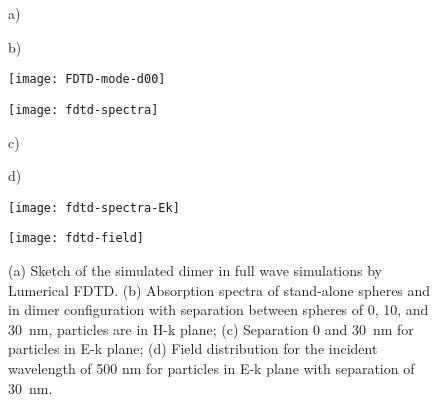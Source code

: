 \documentclass[a4paper]{article}
\begin{document}
\begin{figure}
  \begin{minipage}[h]{0.49\textwidth}    \begin{flushleft}     a)    \end{flushleft}
  \end{minipage}
  \begin{minipage}[h]{0.49\textwidth}    \begin{flushleft}     b)    \end{flushleft}
  \end{minipage}
  \begin{minipage}[h]{0.49\textwidth} 
   \texttt{[image: FDTD-mode-d00]}
  \end{minipage}
  \begin{minipage}[h]{0.49\textwidth} 
   \texttt{[image: fdtd-spectra]}
  \end{minipage}
  \begin{minipage}[h]{0.49\textwidth}    \begin{flushleft}     c)    \end{flushleft}
  \end{minipage}
  \begin{minipage}[h]{0.49\textwidth}    \begin{flushleft}     d)   \end{flushleft}
  \end{minipage}
  \begin{minipage}[h]{0.49\textwidth} 
    \texttt{[image: fdtd-spectra-Ek]}
  \end{minipage}
  \begin{minipage}[h]{0.49\textwidth} 
    \texttt{[image: fdtd-field]}
  \end{minipage}
    \caption{(a) Sketch of the simulated dimer in full wave
      simulations by Lumerical FDTD. (b) Absorption spectra of
      stand-alone spheres and in dimer configuration with separation
      between spheres of 0, 10, and 30~nm, particles are in H-k plane;
      (c) Separation 0 and 30~nm for particles in E-k plane; (d) Field
      distribution for the incident wavelength of 500 nm for particles
      in E-k plane with separation of 30~nm.\label{fig:fdtd}}%
\end{figure}
\end{document}
